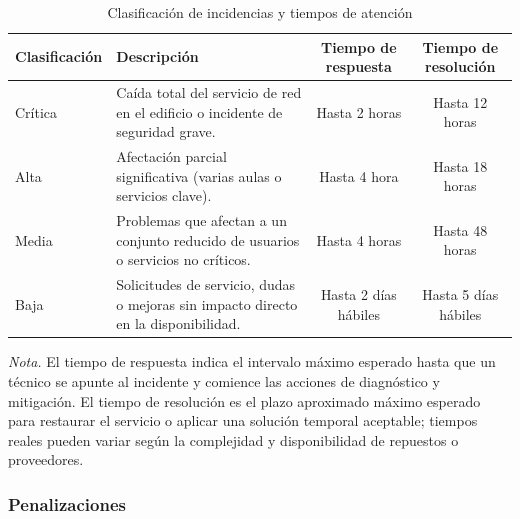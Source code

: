 \begin{table}[H]
    \centering
    \caption{Clasificación de incidencias y tiempos de atención}\label{tab:escalamiento-incidencias}
    \begin{tabular}{p{4cm}p{5cm}cc}
        	\toprule
        	\textbf{Clasificación} & \textbf{Descripción} & \textbf{Tiempo de respuesta} & \textbf{Tiempo de resolución} \\
        \midrule
        Crítica & Caída total del servicio de red en el edificio o incidente de seguridad grave. & Hasta 2 horas & Hasta 12 horas \\
        Alta & Afectación parcial significativa (varias aulas o servicios clave). & Hasta 4 hora & Hasta 18 horas \\
        Media & Problemas que afectan a un conjunto reducido de usuarios o servicios no críticos. & Hasta 4 horas & Hasta 48 horas \\
        Baja & Solicitudes de servicio, dudas o mejoras sin impacto directo en la disponibilidad. & Hasta 2 días hábiles & Hasta 5 días hábiles \\
        \bottomrule
    \end{tabular}
\end{table}

\begin{flushleft}
    	\textit{Nota.} El tiempo de respuesta indica el intervalo máximo esperado hasta que un técnico se apunte al incidente y comience las acciones de diagnóstico y mitigación. El tiempo de resolución es el plazo aproximado máximo esperado para restaurar el servicio o aplicar una solución temporal aceptable; tiempos reales pueden variar según la complejidad y disponibilidad de repuestos o proveedores.
\end{flushleft}

\subsubsection{Penalizaciones}

